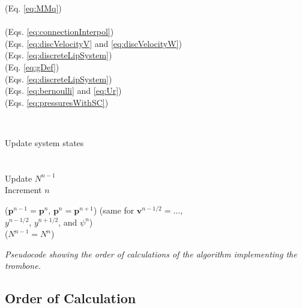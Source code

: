 \begin{algorithm}[t]
{{{\begin{minipage}[c]{0.43\linewidth}
                (Eq. \eqref{eq:MMq})\\
                \vspace{-0.15em}\\
                (Eqs. \eqref{eq:connectionInterpol})\vspace{0.05em}\\
                (Eqs. \eqref{eq:discVelocityV} and \eqref{eq:discVelocityW})\\
                (Eqs. \eqref{eq:discreteLipSystem})\\
                (Eq. \eqref{eq:gDef})\\
                (Eqs. \eqref{eq:discreteLipSystem})\\
                (Eqs. \eqref{eq:bernoulli} and \eqref{eq:Ur})\\
                (Eqs. \eqref{eq:pressuresWithSC})
                \vspace{0.25em}\\
           \end{minipage}
           \\
           \begin{minipage}[c]{0.4\linewidth}
                Update system states\\
                \\
                \\
                Update $N^{n-1}$ \\
                Increment $n$      
            \end{minipage}
            \begin{minipage}[c]{0.5\linewidth}
                ($\mathbf{p}^{n-1} = \mathbf{p}^{n}$, $\mathbf{p}^n=\mathbf{p}^{n+1}$)
                (same for $\mathbf{v}^{n-1/2} = \hdots$,\\
                $y^{n-1/2}$, $y^{n+1/2}$, and $\psi^n$)\\
                ($N^{n-1} = N^n$)\\
            \end{minipage}
            }
        }
    }
    \vspace{0.12cm}
    \caption{\it Pseudocode showing the order of calculations of the algorithm implementing the trombone.\label{alg:calcOrder}}
\end{algorithm}
\subsection{Order of Calculation}

